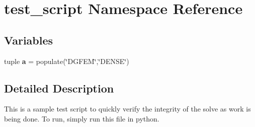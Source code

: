 \hypertarget{namespacetest__script}{\section{test\-\_\-script Namespace Reference}
\label{namespacetest__script}
}
\subsection*{Variables}
\begin{DoxyCompactItemize}
\item 
\hypertarget{namespacetest__script_ad171d176831b53cb688495d8feab295d}{tuple {\bfseries a} = populate(\char`\"{}D\-G\-F\-E\-M\char`\"{},\char`\"{}D\-E\-N\-S\-E\char`\"{})}\label{namespacetest__script_ad171d176831b53cb688495d8feab295d}

\end{DoxyCompactItemize}


\subsection{Detailed Description}
\begin{DoxyVerb}This is a sample test script to quickly verify the integrity of the solve as work is being done.  To run, 
simply run this file in python. \end{DoxyVerb}
 